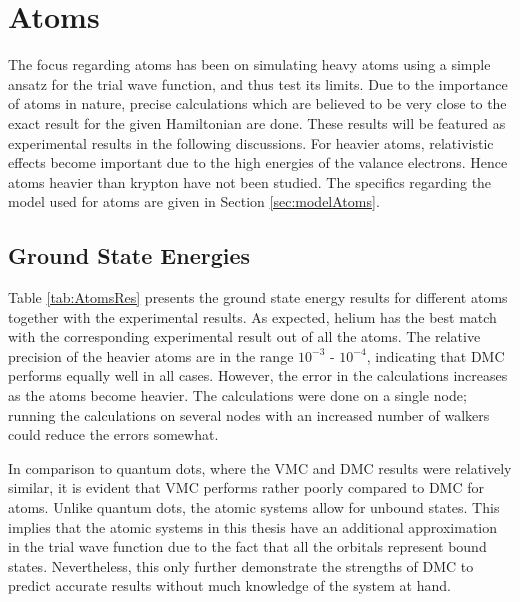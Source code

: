 \section{Atoms}
 
 The focus regarding atoms has been on simulating heavy atoms using a simple ansatz for the trial wave function, and thus test its limits. Due to the importance of atoms in nature, precise calculations which are believed to be very close to the exact result for the given Hamiltonian are done. These results will be featured as experimental results in the following discussions. For heavier atoms, relativistic effects become important due to the high energies of the valance electrons. Hence atoms heavier than krypton have not been studied. The specifics regarding the model used for atoms are given in Section \ref{sec:modelAtoms}.
 
\subsection{Ground State Energies}
 
 Table \ref{tab:AtomsRes} presents the ground state energy results for different atoms together with the experimental results. As expected, helium has the best match with the corresponding experimental result out of all the atoms. The relative precision of the heavier atoms are in the range $10^{-3}$ - $10^{-4}$, indicating that DMC performs equally well in all cases. However, the error in the calculations increases as the atoms become heavier. The calculations were done on a single node; running the calculations on several nodes with an increased number of walkers could reduce the errors somewhat. 
 
 In comparison to quantum dots, where the VMC and DMC results were relatively similar, it is evident that VMC performs rather poorly compared to DMC for atoms. Unlike quantum dots, the atomic systems allow for unbound states. This implies that the atomic systems in this thesis have an additional approximation in the trial wave function due to the fact that all the orbitals represent bound states. Nevertheless, this only further demonstrate the strengths of DMC to predict accurate results without much knowledge of the system at hand.
 
